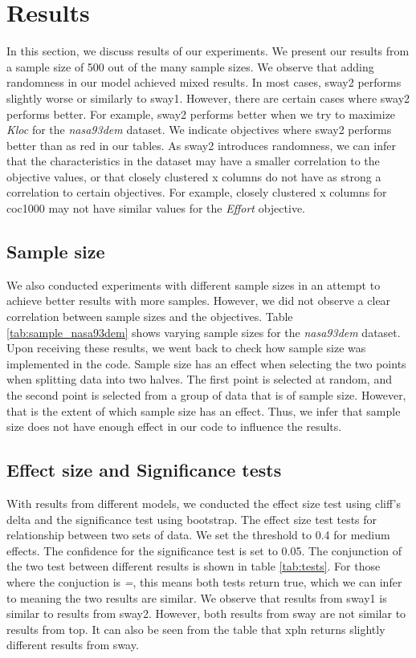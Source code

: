 \section{Results}
\label{sec:results}


In this section, we discuss results of our experiments. We present our
results from a sample size of 500 out of the many sample sizes. We
observe that adding randomness in our model achieved mixed results. In
most cases, sway2 performs slightly worse or similarly to sway1.
However, there are certain cases where sway2 performs better. For
example, sway2 performs better when we try to maximize \textit{Kloc} for
the \textit{nasa93dem} dataset. We indicate objectives where sway2
performs better than as red in our tables. As sway2 introduces
randomness, we can infer that the characteristics in the dataset may
have a smaller correlation to the objective values, or that closely
clustered x columns do not have as strong a correlation to certain
objectives. For example, closely clustered x columns for coc1000 may not
have similar values for the \textit{Effort} objective. 

\subsection{Sample size}
  We also conducted experiments with different sample sizes in an attempt
  to achieve better results with more samples. However, we did not observe
  a clear correlation between sample sizes and the objectives. Table
  \ref{tab:sample_nasa93dem} shows varying sample sizes for the
  \textit{nasa93dem} dataset. Upon receiving these results, we went back
  to check how sample size was implemented in the code. Sample size has an
  effect when selecting the two points when splitting data into two
  halves. The first point is selected at random, and the second point is
  selected from a group of data that is of sample size. However, that is
  the extent of which sample size has an effect. Thus, we infer that
  sample size does not have enough effect in our code to influence the
  results. 

\subsection{Effect size and Significance tests}
  With results from different models, we conducted the effect size test
  using cliff's delta and the significance test using bootstrap. The
  effect size test tests for relationship between two sets of data. We set
  the threshold to 0.4 for medium effects. The confidence for the
  significance test is set to 0.05. The conjunction of the two test
  between different results is shown in table \ref{tab:tests}. For those
  where the conjuction is \textit{=}, this means both tests return true,
  which we can infer to meaning the two results are similar. We observe
  that results from sway1 is similar to results from sway2. However, both
  results from sway are not similar to results from top. It can also be
  seen from the table that xpln returns slightly different results from
  sway. 

